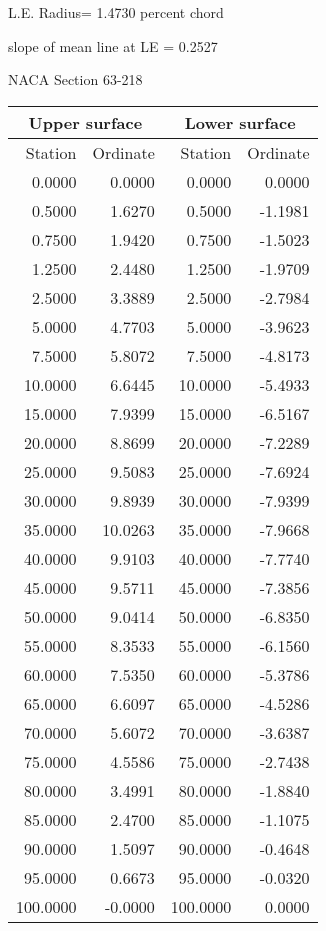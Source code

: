 \documentclass[11pt]{book}
\begin{document}
L.E. Radius=  1.4730 percent chord


 slope of mean line at LE =  0.2527
 \newpage
  \label{s63-218}
 \begin{Large}
 NACA Section 63-218
 \end{Large}
  
 \vspace{8mm}
 \begin{tabular}{|r|r|r|r|} \hline 
 \multicolumn{2}{|c|}{Upper surface} & \multicolumn{2}{|c|}{Lower surface} \\
 \hline
 Station & Ordinate & Station & Ordinate \\
 \hline
0.0000 & 0.0000 & 0.0000 & 0.0000 \\
0.5000 & 1.6270 & 0.5000 & -1.1981 \\
0.7500 & 1.9420 & 0.7500 & -1.5023 \\
1.2500 & 2.4480 & 1.2500 & -1.9709 \\
2.5000 & 3.3889 & 2.5000 & -2.7984 \\
5.0000 & 4.7703 & 5.0000 & -3.9623 \\
7.5000 & 5.8072 & 7.5000 & -4.8173 \\
10.0000 & 6.6445 & 10.0000 & -5.4933 \\
15.0000 & 7.9399 & 15.0000 & -6.5167 \\
20.0000 & 8.8699 & 20.0000 & -7.2289 \\
25.0000 & 9.5083 & 25.0000 & -7.6924 \\
30.0000 & 9.8939 & 30.0000 & -7.9399 \\
35.0000 & 10.0263 & 35.0000 & -7.9668 \\
40.0000 & 9.9103 & 40.0000 & -7.7740 \\
45.0000 & 9.5711 & 45.0000 & -7.3856 \\
50.0000 & 9.0414 & 50.0000 & -6.8350 \\
55.0000 & 8.3533 & 55.0000 & -6.1560 \\
60.0000 & 7.5350 & 60.0000 & -5.3786 \\
65.0000 & 6.6097 & 65.0000 & -4.5286 \\
70.0000 & 5.6072 & 70.0000 & -3.6387 \\
75.0000 & 4.5586 & 75.0000 & -2.7438 \\
80.0000 & 3.4991 & 80.0000 & -1.8840 \\
85.0000 & 2.4700 & 85.0000 & -1.1075 \\
90.0000 & 1.5097 & 90.0000 & -0.4648 \\
95.0000 & 0.6673 & 95.0000 & -0.0320 \\
100.0000 & -0.0000 & 100.0000 & 0.0000 \\
 \hline 
 \end{tabular}
\end{document}
